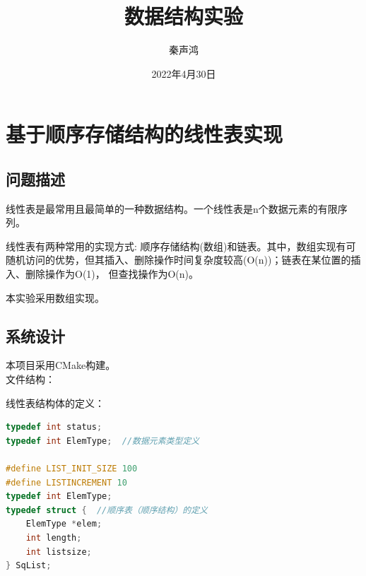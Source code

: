 \documentclass[supercite]{Experimental_Report}
\title{~~~~~~数据结构实验~~~~~~}
\author{秦声鸿}
\date{2022年4月30日}
\theoremstyle{definition}
\begin{document}
\maketitle

\clearpage


\tableofcontents[level=2]

\clearpage


\section{基于顺序存储结构的线性表实现}

\subsection{问题描述}

线性表是最常用且最简单的一种数据结构。一个线性表是n个数据元素的有限序列。\cite{DataStructure}

线性表有两种常用的实现方式: 顺序存储结构(数组)和链表。其中，数组实现有可随机访问的优势，但其插入、删除操作时间复杂度较高(O(n))；链表在某位置的插入、删除操作为O(1)， 但查找操作为O(n)。

本实验采用数组实现。

\subsection{系统设计}

本项目采用CMake构建。\\

\noindent
文件结构：

\newpage
\noindent
线性表结构体的定义：
\begin{lstlisting}[language=C++, frame=single]
typedef int status;
typedef int ElemType;  //数据元素类型定义

#define LIST_INIT_SIZE 100
#define LISTINCREMENT 10
typedef int ElemType;
typedef struct {  //顺序表（顺序结构）的定义
	ElemType *elem;
	int length;
	int listsize;
} SqList;
\end{lstlisting}
\end{document}
